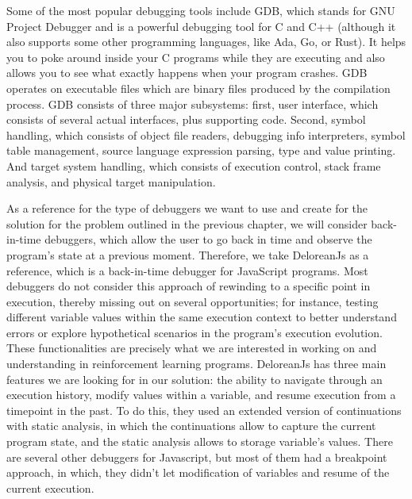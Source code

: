 Some of the most popular debugging tools include \ac{GDB}\cite{stallman2011debugging}, 
which stands for GNU Project Debugger and is a powerful 
debugging tool for C and C++ (although it also supports some other programming languages,
like Ada, Go, or Rust). It helps you to poke around inside your C programs while 
they are executing and also allows you to see what exactly happens when your program 
crashes. \ac{GDB} operates on executable files which are binary files produced by the 
compilation process. \ac{GDB} consists of three major subsystems: first, user interface, which 
consists of several actual interfaces, plus supporting code. Second, symbol handling, 
which consists of object file readers, debugging info interpreters, symbol table 
management, source language expression parsing, type and value printing. And target 
system handling, which consists of execution control, stack frame analysis, and 
physical target manipulation\cite{stallman2011debugging}.

As a reference for the type of debuggers we want to use and create for the solution 
for the problem outlined in the previous chapter, we will consider back-in-time 
debuggers, which allow the user to go back in time and observe the program's state 
at a previous moment. Therefore, we take DeloreanJs\cite{delorean23} as a reference, 
which is a back-in-time debugger for JavaScript programs. Most debuggers do not 
consider this approach of rewinding to a specific point in execution, thereby 
missing out on several opportunities; for instance, testing different variable 
values within the same execution context to better understand errors or explore 
hypothetical scenarios in the program's execution evolution. These functionalities 
are precisely what we are interested in working on and understanding in 
reinforcement learning programs. DeloreanJs has three main features we are looking 
for in our solution: the ability to navigate through an execution history, modify 
values within a variable, and resume execution from a timepoint in the 
past\cite{delorean23}. To do this, they used an extended version of continuations 
with static analysis, in which the continuations allow to capture the current program 
state, and the static analysis allows to storage variable's values. There are several 
other debuggers for Javascript, but most of them had a breakpoint approach, in which,
they didn't let modification of variables and resume of the current execution.

